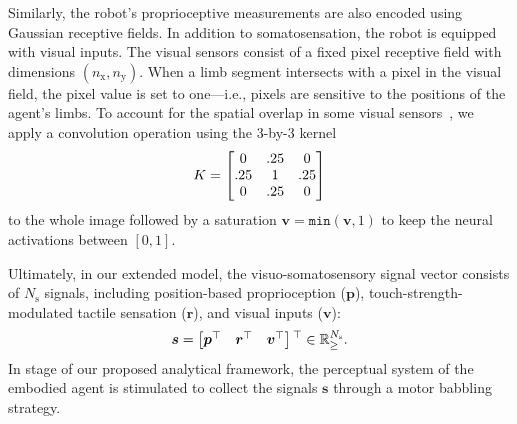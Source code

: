 Similarly, the robot's proprioceptive measurements are also encoded using Gaussian receptive fields. In addition to somatosensation, the robot is equipped with visual inputs. The visual sensors consist of a fixed pixel receptive field with dimensions $(n_\text{x}, n_\text{y})$. When a limb segment intersects with a pixel in the visual field, the pixel value is set to one---i.e., pixels are sensitive to the positions of the agent's limbs. To account for the spatial overlap in some visual sensors~\cite{Marshall2015}, we apply a convolution operation using the 3-by-3 kernel \[
\small
K = \begin{bmatrix} 
0 & .25 & 0 \\ 
.25 & 1 & .25 \\ 
0 & .25 & 0 
\end{bmatrix}
\] to the whole image followed by a saturation $\bm{v}=\texttt{min}(\bm{v},1)$ to keep the neural activations between $[0,1]$.

Ultimately, in our extended model, the visuo-somatosensory signal vector consists of $N_\text{s}$ signals, including position-based proprioception ($\bm{p}$), touch-strength-modulated tactile sensation ($\bm{r}$), and visual inputs ($\bm{v}$):  
\begin{equation}
	\bm{s} = \begin{bmatrix}
		\bm{p}{^{\top}} & \bm{r}{^{\top}} & \bm{v}{^{\top}}
	\end{bmatrix}{^{\top}} \in \mathbb{R}^{N_\text{s}}_{\geq}.
\end{equation}
In stage  of our proposed analytical framework, the perceptual system of the embodied agent is stimulated to collect the signals $\bm{s}$ through a motor babbling strategy.

